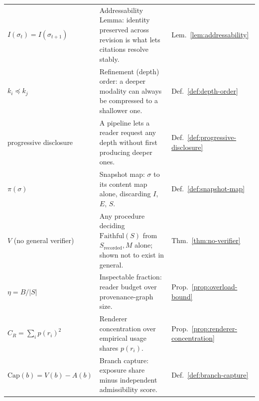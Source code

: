 \documentclass[11pt]{article}
\theoremstyle{definition}
\begin{document}
\begin{longtable}{@{}p{}p{}p{}@{}}
$I(\sigma_t) = I(\sigma_{t+1})$ & Addressability Lemma: identity preserved across revision is what lets citations resolve stably. & Lem.~\ref{lem:addressability} \\
$k_i \preceq k_j$ & Refinement (depth) order: a deeper modality can always be compressed to a shallower one. & Def.~\ref{def:depth-order} \\
progressive disclosure & A pipeline lets a reader request any depth without first producing deeper ones. & Def.~\ref{def:progressive-disclosure} \\
$\pi(\sigma)$ & Snapshot map: $\sigma$ to its content map alone, discarding $I$, $E$, $S$. & Def.~\ref{def:snapshot-map} \\
$V$ (no general verifier) & Any procedure deciding $\mathrm{Faithful}(S)$ from $S_{\mathrm{recorded}}, M$ alone; shown not to exist in general. & Thm.~\ref{thm:no-verifier} \\
$\eta = B/|S|$ & Inspectable fraction: reader budget over provenance-graph size. & Prop.~\ref{prop:overload-bound} \\
$C_R = \sum_i p(r_i)^2$ & Renderer concentration over empirical usage shares $p(r_i)$. & Prop.~\ref{prop:renderer-concentration} \\
$\mathrm{Cap}(b) = V(b) - A(b)$ & Branch capture: exposure share minus independent admissibility score. & Def.~\ref{def:branch-capture} \\
\bottomrule
\end{longtable}
\end{document}
